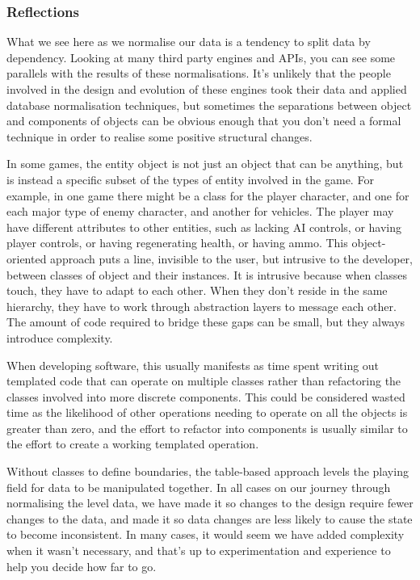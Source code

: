 \documentclass[a4paper,12pt]{book}
\begin{document}
\subsubsection{Reflections}

What we see here as we normalise our data is a tendency to split data by dependency.
Looking at many third party engines and APIs, you can see some parallels with the results of these normalisations.
It's unlikely that the people involved in the design and evolution of these engines took their data and applied database normalisation techniques, but sometimes the separations between object and components of objects can be obvious enough that you don't need a formal technique in order to realise some positive structural changes.

In some games, the entity object is not just an object that can be anything, but is instead a specific subset of the types of entity involved in the game.
For example, in one game there might be a class for the player character, and one for each major type of enemy character, and another for vehicles.
The player may have different attributes to other entities, such as lacking AI controls, or having player controls, or having regenerating health, or having ammo.
This object-oriented approach puts a line, invisible to the user, but intrusive to the developer, between classes of object and their instances.
It is intrusive because when classes touch, they have to adapt to each other.
When they don't reside in the same hierarchy, they have to work through abstraction layers to message each other.
The amount of code required to bridge these gaps can be small, but they always introduce complexity.

When developing software, this usually manifests as time spent writing out templated code that can operate on multiple classes rather than refactoring the classes involved into more discrete components.
This could be considered wasted time as the likelihood of other operations needing to operate on all the objects is greater than zero, and the effort to refactor into components is usually similar to the effort to create a working templated operation.

Without classes to define boundaries, the table-based approach levels the playing field for data to be manipulated together.
In all cases on our journey through normalising the level data, we have made it so changes to the design require fewer changes to the data, and made it so data changes are less likely to cause the state to become inconsistent.
In many cases, it would seem we have added complexity when it wasn't necessary, and that's up to experimentation and experience to help you decide how far to go.
\end{document}
